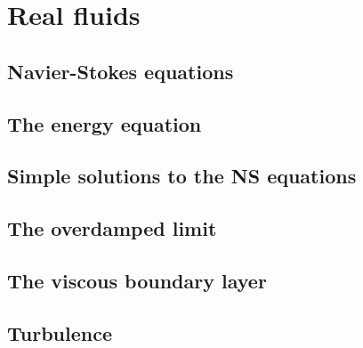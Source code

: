 \part{Real fluids}


\chapter{Navier-Stokes equations}








\chapter{The energy equation}


\chapter{Simple solutions to the NS equations}










\chapter{The overdamped limit}



\chapter{The viscous boundary layer}



\chapter{Turbulence}
